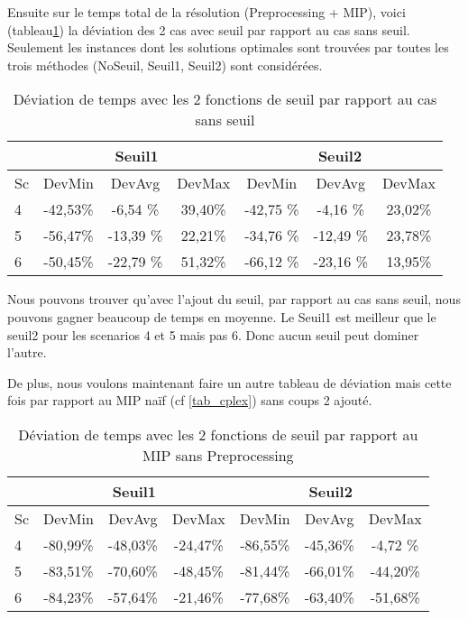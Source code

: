 \documentclass[twoside,fleqn]{EPURapport}
\begin{document}
Ensuite sur le temps total de la résolution (Preprocessing + MIP), voici (tableau\ref{tab_cut2_seuil_tim_cmp}) la déviation des 2 cas avec seuil par rapport au cas sans seuil. Seulement les instances dont les solutions optimales sont trouvées par toutes les trois méthodes (NoSeuil, Seuil1, Seuil2) sont considérées.
\begin{table}[h]
    \centering
    \begin{tabular}{|l|c|c|c|c|c|c|}
    	\hline
  &\multicolumn{3}{c}{Seuil1}	&\multicolumn{3}{|c|}{Seuil2}\\ \hline
 Sc  & 	DevMin	& DevAvg	& DevMax& 	DevMin	& DevAvg	&DevMax  \\ \hline
4 & -42,53\%	&	-6,54	\% &39,40\% &	-42,75	\% &-4,16	\% &23,02\%    \\ \hline
5 & -56,47\%	&	-13,39	\% &22,21\% &	-34,76	\% &-12,49	\% &23,78\%     \\ \hline
6  & -50,45\%	&	-22,79	\%& 51,32\%& 	-66,12	\%& -23,16	\%& 13,95\%  \\ \hline
    \end{tabular}
    \caption{Déviation de temps avec les 2 fonctions de seuil par rapport au cas sans seuil}
    \label{tab_cut2_seuil_tim_cmp}
    
\end{table}
\bigskip

Nous pouvons trouver qu'avec l'ajout du seuil, par rapport au cas sans seuil, nous pouvons gagner beaucoup de temps en moyenne. Le Seuil1 est meilleur que le seuil2 pour les scenarios 4 et 5 mais pas 6. Donc aucun seuil peut dominer l'autre.

De plus, nous voulons maintenant faire un autre tableau de déviation mais cette fois par rapport au MIP naïf (cf \ref{tab_cplex}) sans coups 2 ajouté.
\begin{table}[h]
    \centering
    \begin{tabular}{|l|c|c|c|c|c|c|}
    	\hline
  &\multicolumn{3}{c}{Seuil1}	&\multicolumn{3}{|c|}{Seuil2}\\ \hline
 Sc  & 	DevMin	& DevAvg	& DevMax& 	DevMin	& DevAvg	&DevMax  \\ \hline
4&	-80,99\%&	-48,03\%&	-24,47\%&	-86,55\%&	-45,36\%&	-4,72 \%    \\ \hline
5&	-83,51\%&	-70,60\%&	-48,45\%&	-81,44\%&	-66,01\%&	-44,20\%     \\ \hline
6&	-84,23\%&	-57,64\%&	-21,46\%&	-77,68\%&	-63,40\%&	-51,68\%  \\ \hline
    \end{tabular}
    \caption{Déviation de temps avec les 2 fonctions de seuil par rapport au MIP sans Preprocessing}
    \label{tab_cut2_seuil_tim_cmp2}
\end{table}
\bigskip
\end{document}
